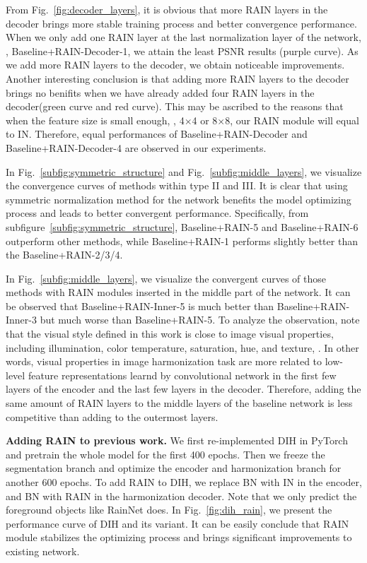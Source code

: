 \documentclass[final]{cvpr}
\begin{document}
From Fig.~\ref{fig:decoder_layers}, it is obvious that more RAIN layers in the decoder brings more stable training process and better convergence performance. When we only add one RAIN layer at the last normalization layer of the network, \ie, Baseline+RAIN-Decoder-1, we attain the least PSNR results (purple curve). As we add more RAIN layers to the decoder, we obtain noticeable improvements. Another interesting conclusion is that adding more RAIN layers to the decoder brings no benifits when we have already added four RAIN layers in the decoder(green curve and red curve). This may be ascribed to the reasons that when the feature size is small enough, \eg, 4$\times$4 or 8$\times$8, our RAIN module will equal to IN. Therefore, equal performances of Baseline+RAIN-Decoder and Baseline+RAIN-Decoder-4 are observed in our experiments.  

In Fig.~\ref{subfig:symmetric_structure} and Fig.~\ref{subfig:middle_layers}, we visualize the convergence curves of methods within type II and III. It is clear that using symmetric normalization method for the network benefits the model optimizing process and leads to better convergent performance. Specifically, from subfigure~\ref{subfig:symmetric_structure}, Baseline+RAIN-5 and Baseline+RAIN-6 outperform other methods, while Baseline+RAIN-1 performs slightly better than the Baseline+RAIN-2/3/4. 

In Fig.~\ref{subfig:middle_layers}, we visualize the convergent curves of those methods with RAIN modules inserted in the middle part of the network. It can be observed that Baseline+RAIN-Inner-5 is much better than Baseline+RAIN-Inner-3 but much worse than Baseline+RAIN-5. To analyze the observation, note that the visual style defined in this work is close to image visual properties, including illumination, color temperature, saturation, hue, and texture, \etc. In other words, visual properties in image harmonization task are more related to low-level feature  representations learnd by convolutional network in the first few layers of the encoder and the last few layers in the decoder. Therefore, adding the same amount of RAIN layers to the middle layers of the baseline network is less competitive than adding to the outermost layers. 



\noindent
\textbf{Adding RAIN to previous work.}
We first re-implemented DIH in PyTorch and pretrain the whole model for the first 400 epochs. Then we freeze the segmentation branch and optimize the encoder and harmonization branch for another 600 epochs. To add RAIN to DIH, we replace BN with IN in the encoder, and BN with RAIN in the harmonization decoder. Note that we only predict the foreground objects like RainNet does. In Fig.~\ref{fig:dih_rain}, we present the performance curve of DIH and its variant. It can be easily conclude that RAIN module stabilizes the optimizing process and brings significant improvements to existing network. 
\end{document}

